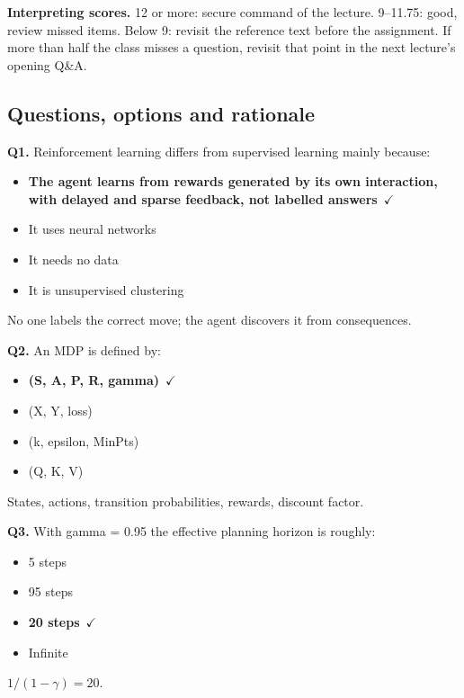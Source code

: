 \documentclass[11pt]{article}
\begin{document}
\textbf{Interpreting scores.} 12 or more: secure command of the lecture. 9--11.75: good, review missed items. Below 9: revisit the reference text before the assignment. If more than half the class misses a question, revisit that point in the next lecture's opening Q\&A.

\subsection*{Questions, options and rationale}

{\small

\noindent\textbf{Q1.} Reinforcement learning differs from supervised learning mainly because:\begin{itemize}[leftmargin=2.2em,itemsep=0pt,topsep=1pt]\item[\textbf{A.}] \textbf{The agent learns from rewards generated by its own interaction, with delayed and sparse feedback, not labelled answers}~{\color{GrnN}$\checkmark$}\item[B.] It uses neural networks\item[C.] It needs no data\item[D.] It is unsupervised clustering\end{itemize} No one labels the correct move; the agent discovers it from consequences.\par\medskip

\noindent\textbf{Q2.} An MDP is defined by:\begin{itemize}[leftmargin=2.2em,itemsep=0pt,topsep=1pt]\item[\textbf{A.}] \textbf{(S, A, P, R, gamma)}~{\color{GrnN}$\checkmark$}\item[B.] (X, Y, loss)\item[C.] (k, epsilon, MinPts)\item[D.] (Q, K, V)\end{itemize} States, actions, transition probabilities, rewards, discount factor.\par\medskip

\noindent\textbf{Q3.} With gamma = 0.95 the effective planning horizon is roughly:\begin{itemize}[leftmargin=2.2em,itemsep=0pt,topsep=1pt]\item[A.] 5 steps\item[B.] 95 steps\item[\textbf{C.}] \textbf{20 steps}~{\color{GrnN}$\checkmark$}\item[D.] Infinite\end{itemize} $1/(1-\gamma)=20$.\par\medskip

}
\end{document}
